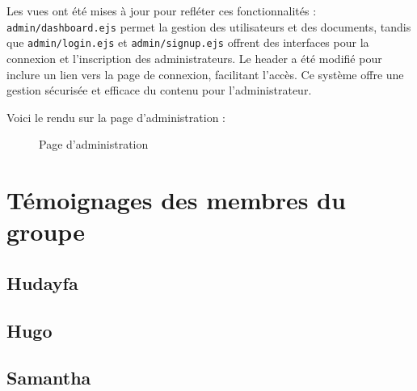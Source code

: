 \documentclass[12pt,a4paper]{article}
\begin{document}
Les vues ont été mises à jour pour refléter ces fonctionnalités : \texttt{admin/dashboard.ejs} permet la gestion des utilisateurs et des documents, tandis que \texttt{admin/login.ejs} et \texttt{admin/signup.ejs} offrent des interfaces pour la connexion et l'inscription des administrateurs. Le header a été modifié pour inclure un lien vers la page de connexion, facilitant l'accès. Ce système offre une gestion sécurisée et efficace du contenu pour l'administrateur. \\

\newpage

Voici le rendu sur la page d'administration : 

\begin{figure}[!h]
	\begin{center}
		\setlength{\fboxsep}{0pt}
		\caption{Page d'administration}
	\end{center}
\end{figure}

\newpage


\section{Témoignages des membres du groupe}

\subsection*{Hudayfa}


\subsection*{Hugo}


\subsection*{Samantha}
\end{document}
